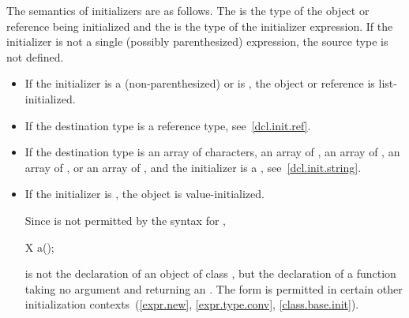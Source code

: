 \pnum
The semantics of initializers are as follows.
The
%
is the type of the object or reference being initialized and the
is the type of the initializer expression.
If the initializer is not a single (possibly parenthesized) expression, the
source type is not defined.
\begin{itemize}
\item
If the initializer is a (non-parenthesized) 
or is \tcode{=} , the object or reference
is list-initialized.
\item
If the destination type is a reference type, see~\ref{dcl.init.ref}.
\item
If the destination type is an array of characters,
an array of ,
an array of ,
an array of ,
or an array of
,
and the initializer is a , see~\ref{dcl.init.string}.
\item If the initializer is \tcode{()}, the object is value-initialized.
%
\begin{note}
Since
\tcode{()}
is not permitted by the syntax for
,
\begin{codeblock}
X a();
\end{codeblock}
is not the declaration of an object of class
,
but the declaration of a function taking no argument and returning an
.
The form
\tcode{()}
is permitted in certain other initialization contexts~(\ref{expr.new},
\ref{expr.type.conv}, \ref{class.base.init}).
\end{note}


\end{itemize}
